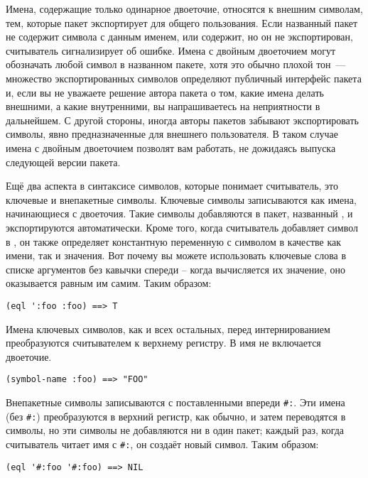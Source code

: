 Имена, содержащие только одинарное двоеточие, относятся к внешним символам, тем, которые
пакет экспортирует для общего пользования. Если названный пакет не содержит символа с
данным именем, или содержит, но он не экспортирован, считыватель сигнализирует об
ошибке. Имена с двойным двоеточием могут обозначать любой символ в названном пакете, хотя
это обычно плохой тон~--- множество экспортированных символов определяют публичный
интерфейс пакета и, если вы не уважаете решение автора пакета о том, какие имена делать
внешними, а какие внутренними, вы напрашиваетесь на неприятности в дальнейшем. С другой
стороны, иногда авторы пакетов забывают экспортировать символы, явно предназначенные для
внешнего пользователя. В таком случае имена с двойным двоеточием позволят вам работать, не
дожидаясь выпуска следующей версии пакета.

Ещё два аспекта в синтаксисе символов, которые понимает считыватель, это ключевые и
внепакетные символы. Ключевые символы записываются как имена, начинающиеся с
двоеточия. Такие символы добавляются в пакет, названный  , и экспортируются
автоматически. Кроме того, когда считыватель добавляет символ в , он также
определяет константную переменную с символом в качестве как имени, так и значения. Вот
почему вы можете использовать ключевые слова в списке аргументов без кавычки спереди --
когда вычисляется их значение, оно оказывается равным им самим.  Таким образом:

\begin{lstlisting}
(eql ':foo :foo) ==> T
\end{lstlisting}

Имена ключевых символов, как и всех остальных, перед интернированием преобразуются
считывателем к верхнему регистру. В имя не включается двоеточие.

\begin{lstlisting}
(symbol-name :foo) ==> "FOO"
\end{lstlisting}

Внепакетные символы записываются с поставленными впереди \lstinline!#:!. Эти имена (без
\lstinline!#:!) преобразуются в верхний регистр, как обычно, и затем переводятся в
символы, но эти символы не добавляются ни в один пакет; каждый раз, когда считыватель
читает имя с \lstinline!#:!, он создаёт новый символ.  Таким образом:

\begin{lstlisting}
(eql '#:foo '#:foo) ==> NIL
\end{lstlisting}


